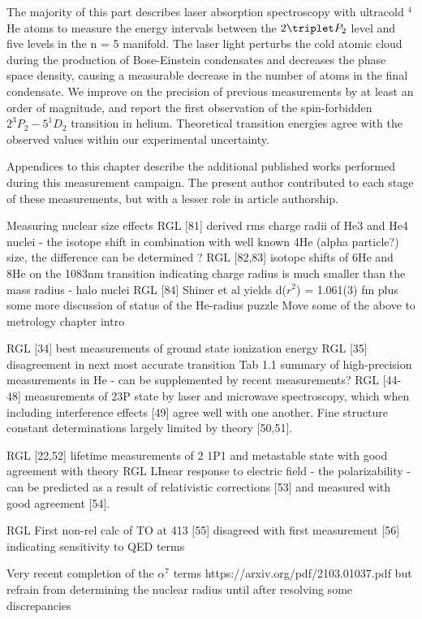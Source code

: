 The majority of this part describes laser absorption spectroscopy with ultracold $^4$He atoms to measure the energy intervals between the $2\triplet P_2$ level and five levels in the n = 5 manifold.
	The laser light perturbs the cold atomic cloud during the production of Bose-Einstein condensates and decreases the phase space density, causing a measurable decrease in the number of atoms in the final condensate.
	We improve on the precision of previous measurements by at least an order of magnitude, and report the first observation of the spin-forbidden $2^{3\!}P_2 - 5^{1\!}D_2$ transition in helium.
	Theoretical transition energies agree with the observed values within our experimental uncertainty.

Appendices to this chapter describe the additional published works performed during this measurement campaign.
	The present author contributed to each stage of these measurements, but with a lesser role in article authorship.

Measuring nuclear size effects
			RGL [81] derived rms charge radii of He3 and He4 nuclei - the isotope shift in combination with well known 4He (alpha particle?) size, the difference can be determined ? 
			RGL [82,83] isotope shifts of 6He and 8He on the 1083nm transition indicating charge radius is much smaller than the mass radius - halo nuclei 
			RGL [84] Shiner et al yields d($r^2$) = 1.061(3) fm 
			plus some more discussion of status of the He-radius puzzle 
			Move some of the above to metrology chapter intro

						RGL [34] best measurements of ground state ionization energy 
			RGL [35] disagreement in next most accurate transition 
			    Tab 1.1 summary of high-precision measurements in He - can be supplemented by recent measurements?
			RGL [44-48] measurements of 23P state by laser and microwave spectroscopy, which when including interference effects [49] agree well with one another.
	Fine structure constant determinations largely limited by theory [50,51].
	
			RGL [22,52] lifetime measurements of 2 1P1 and metastable state with good agreement with theory 
			RGL LInear response to electric field - the polarizability - can be predicted as a result of relativistic corrections [53] and measured with good agreement [54].
	 
			RGL First non-rel calc of TO at 413 [55] disagreed with first measurement [56] indicating sensitivity to QED terms 

Very recent completion of the $\alpha^7$ terms https://arxiv.org/pdf/2103.01037.pdf but refrain from determining the nuclear radius until after resolving some discrepancies


